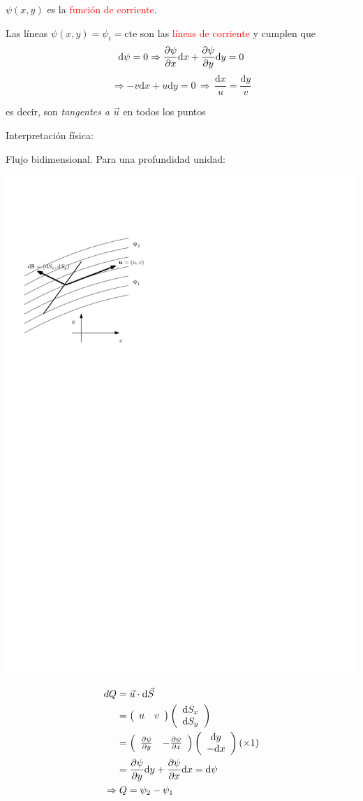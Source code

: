 	
	$\psi(x,y)$ es la \textcolor{red}{función de corriente}.
	
	Las líneas $\psi(x,y)=\psi_{i}=\text{cte}$ son las \textcolor{red}{líneas
		de corriente} y cumplen que 
	\[
	\text{d}\psi=0\Rightarrow\frac{\partial \psi}{\partial x}\text{d}x+\frac{\partial \psi}{\partial y}\text{d}y=0
	\]
	\[
	\Rightarrow-v\text{d}x+u\text{d}y=0\,\Rightarrow\,\frac{\text{d}x}{u}=\frac{\text{d}y}{v}
	\]
	
	es decir, son \emph{tangentes a $\vec{u}$} en todos los puntos

	
Interpretación física:
		
		Flujo bidimensional. Para una profundidad unidad:
		
\begin{center}
	\includegraphics[width=0.4\linewidth]{TeX_files/chapter04-Dinamica/Phi1}
\end{center}


			\begin{align*}
				dQ & =\vec{u}\cdot\text{d}\vec{S}\\
				 & =  \left(\begin{array}{cc}
					u & v\end{array}\right)\left(\begin{array}{c}
					\text{d}S_{x}\\
					\text{d}S_{y}
				\end{array}\right)\\
				& = \left(\begin{array}{cc}
					\frac{\partial \psi}{\partial y} & -\frac{\partial \psi}{\partial x}\end{array}\right)\left(\begin{array}{c}
					\text{d}y\\
					-\text{d}x
				\end{array}\right)(\times1)\\
				& =  \frac{\partial \psi}{\partial y}\text{d}y+\frac{\partial \psi}{\partial x}\text{d}x=\text{d}\psi\\
				\Rightarrow & \; Q=\psi_{2}-\psi_{1}
			\end{align*}


